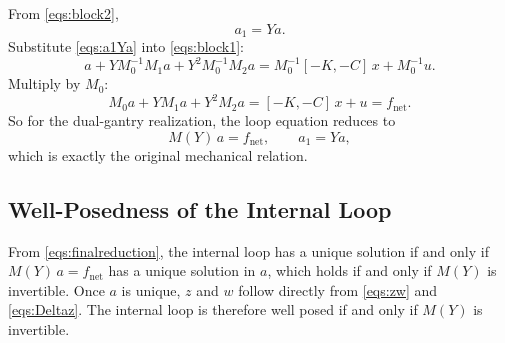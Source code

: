 \documentclass[11pt]{article}
\newcommand{\R}{\mathbb{R}}
\begin{document}
From \eqref{eqs:block2},
\begin{equation}
    a_1 = Ya.
    \label{eqs:a1Ya}
\end{equation}
Substitute \eqref{eqs:a1Ya} into \eqref{eqs:block1}:
\begin{equation}
    a + Y M_0^{-1}M_1 a + Y^2 M_0^{-1}M_2 a
    = M_0^{-1}[-K,-C]\,x + M_0^{-1}u.
    \label{eqs:areduced1}
\end{equation}
Multiply by $M_0$:
\begin{equation}
    M_0 a + Y M_1 a + Y^2 M_2 a = [-K,-C]\,x + u = f_{\mathrm{net}}.
    \label{eqs:areduced2}
\end{equation}
So for the dual-gantry realization, the loop equation reduces to
\begin{equation}
    M(Y)\,a = f_{\mathrm{net}},
    \qquad
    a_1 = Ya,
    \label{eqs:finalreduction}
\end{equation}
which is exactly the original mechanical relation.

\subsection{Well-Posedness of the Internal Loop}
From \eqref{eqs:finalreduction}, the internal loop has a unique solution if and
only if $M(Y)\,a = f_{\mathrm{net}}$ has a unique solution in $a$, which holds
if and only if $M(Y)$ is invertible. Once $a$ is unique, $z$ and $w$ follow directly from \eqref{eqs:zw} and
\eqref{eqs:Deltaz}. The internal loop is therefore well posed if and only if
$M(Y)$ is invertible.




\end{document}
